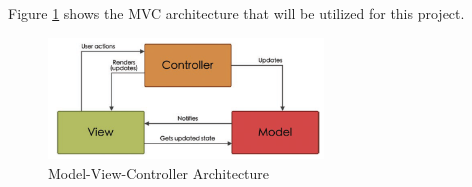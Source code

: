 Figure \ref{fig:mvc} shows the MVC architecture that will be utilized for this project.

\begin{figure}[!ht]
    \centering
    \includegraphics[width=0.65\textwidth]{texs/Part2/chapter1/image/mvc.png}
    \caption{Model-View-Controller Architecture \cite[46]{Garca2023}}
    \label{fig:mvc}
\end{figure}